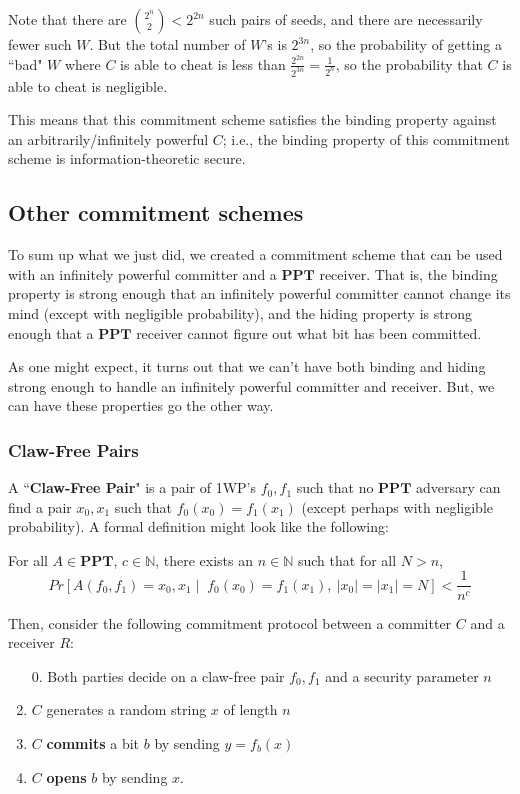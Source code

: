 \documentclass[11pt]{article}
\newcommand{\PPT}{\mathbf{PPT}}
\newcommand{\N}{\mathbb{N}}
\begin{document}
Note that there are \(\binom{2^n}{2}<2^{2n}\) such pairs of seeds, and there are necessarily fewer such \(W\). But the total number of \(W\)'s is \(2^{3n}\), so the probability of getting a ``bad" \(W\) where \(C\) is able to cheat is less than \(\frac{2^{2n}}{2^{3n}} = \frac{1}{2^n}\), so the probability that \(C\) is able to cheat is negligible. \medskip

This means that this commitment scheme satisfies the binding property against an arbitrarily/infinitely powerful \(C\); i.e., the binding property of this commitment scheme is information-theoretic secure.

\newpage
\subsection{Other commitment schemes}

To sum up what we just did, we created a commitment scheme that can be used with an infinitely powerful committer and a \(\PPT\) receiver. That is, the binding property is strong enough that an infinitely powerful committer cannot change its mind (except with negligible probability), and the hiding property is strong enough that a \(\PPT\) receiver cannot figure out what bit has been committed.\bigskip

As one might expect, it turns out that we can't have both binding and hiding strong enough to handle an infinitely powerful committer and receiver. But, we can have these properties go the other way.

\subsubsection{Claw-Free Pairs}

A ``\textbf{Claw-Free Pair}" is a pair of 1WP's \(f_0,f_1\) such that no \(\PPT\) adversary can find a pair \(x_0,x_1\) such that \(f_0(x_0) = f_1(x_1)\) (except perhaps with negligible probability). A formal definition might look like the following:\medskip

For all \(A\in\PPT\), \(c\in\N\), there exists an \(n\in\N\) such that for all \(N>n\), 
\[Pr[A(f_0,f_1) = x_0,x_1\mid\; f_0(x_0)=f_1(x_1), \: |x_0|=|x_1| = N]< \frac{1}{n^c}\]\bigskip

Then, consider the following commitment protocol between a committer \(C\) and a receiver \(R\):

\begin{enumerate}
\item [0.] Both parties decide on a claw-free pair \(f_0,f_1\) and a security parameter \(n\)
\item \(C\) generates a random string \(x\) of length \(n\)
\item \(C\) \textbf{commits} a bit \(b\) by sending \(y=f_b(x)\)
\item \(C\) \textbf{opens} \(b\) by sending \(x\).
\end{enumerate}
\end{document}
